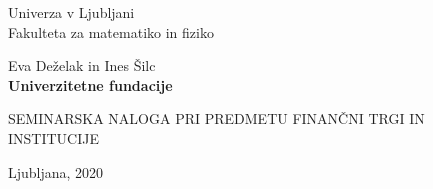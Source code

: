 \documentclass[12pt, a4paper]{article}
\begin{document}
\begin{titlepage}
\begin{center}

\large
Univerza v Ljubljani\\
\normalsize
Fakulteta za matematiko in fiziko\\

\vspace{3 cm} 

\large
Eva Deželak in Ines Šilc\\

\vspace{0.5cm}
\LARGE
\textbf{Univerzitetne fundacije}

\vspace{0.5 cm}
\normalsize


\vspace{1.5cm}
\normalsize
SEMINARSKA NALOGA PRI PREDMETU FINANČNI TRGI IN INSTITUCIJE

\vspace{3cm}


\vfill

\large Ljubljana, 2020

\end{center}
\end{titlepage}

\newpage

\tableofcontents

\newpage

\listoffigures

\newpage

\newpage
%
%
\end{document}
